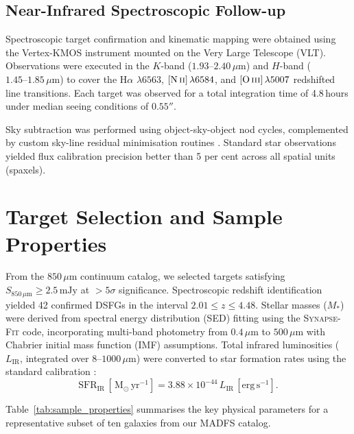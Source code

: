 \documentclass[fleqn,usenatbib]{mnras}
\newcommand{\mJy}{\,\mathrm{mJy}}
\newcommand{\Msun}{\,\mathrm{M}_\odot}
\begin{document}
\subsection{Near-Infrared Spectroscopic Follow-up}
Spectroscopic target confirmation and kinematic mapping were obtained using the Vertex-KMOS instrument mounted on the Very Large Telescope (VLT). Observations were executed in the $K$-band ($1.93\text{--}2.40\,\mu\mathrm{m}$) and $H$-band ($1.45\text{--}1.85\,\mu\mathrm{m}$) to cover the $\mathrm{H}\alpha$ $\lambda 6563$, $[\mathrm{N\,\textsc{ii}}]\,\lambda 6584$, and $[\mathrm{O\,\textsc{iii}}]\,\lambda 5007$ redshifted line transitions. Each target was observed for a total integration time of 4.8\,hours under median seeing conditions of $0.55''$.

Sky subtraction was performed using object-sky-object nod cycles, complemented by custom sky-line residual minimisation routines \citep{Vance2022}. Standard star observations yielded flux calibration precision better than 5 per cent across all spatial units (spaxels).

\section{Target Selection and Sample Properties}
\label{sec:sample}

From the $850\,\mu\mathrm{m}$ continuum catalog, we selected targets satisfying $S_{850\,\mu\mathrm{m}} \ge 2.5\mJy$ at $> 5\sigma$ significance. Spectroscopic redshift identification yielded 42 confirmed DSFGs in the interval $2.01 \le z \le 4.48$. Stellar masses ($M_*$) were derived from spectral energy distribution (SED) fitting using the \textsc{Synapse-Fit} code, incorporating multi-band photometry from $0.4\,\mu\mathrm{m}$ to $500\,\mu\mathrm{m}$ with Chabrier initial mass function (IMF) assumptions. Total infrared luminosities ($L_{\mathrm{IR}}$, integrated over $8\text{--}1000\,\mu\mathrm{m}$) were converted to star formation rates using the standard calibration \citep{Kennicutt2012}:
\begin{equation}
\mathrm{SFR}_{\mathrm{IR}} \, [\Msun\,\mathrm{yr}^{-1}] = 3.88 \times 10^{-44} \, L_{\mathrm{IR}} \, [\mathrm{erg\,s}^{-1}].
\label{eq:sfr}
\end{equation}

Table~\ref{tab:sample_properties} summarises the key physical parameters for a representative subset of ten galaxies from our MADFS catalog.
\end{document}
